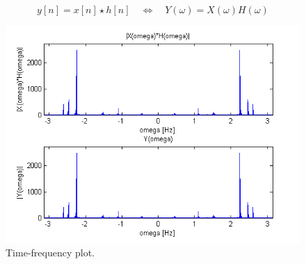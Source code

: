 \documentclass[final]{scrreprt} %
\begin{document}
\begin{equation}
y[n] = x[n]\star h[n] \quad \Leftrightarrow \quad Y(\omega) = X(\omega)H(\omega) 
\label{eq:convprop}
\end{equation}


\begin{figure}[h]
\centering
\includegraphics[scale = 0.5]{resources/labday1/theconvolutionproperty.png}
\caption{Time-frequency plot.}
\label{fig:convpro}
\end{figure}
\end{document}

